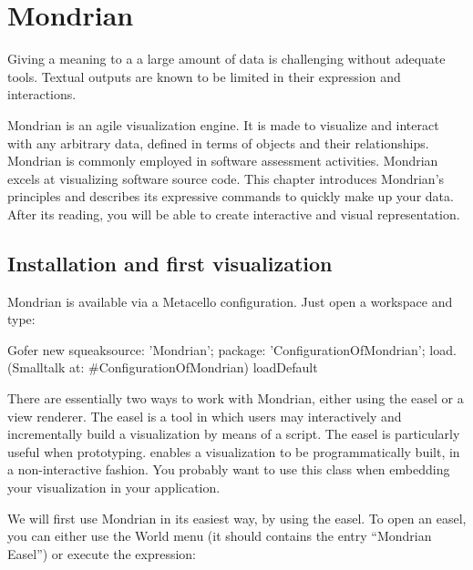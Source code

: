 \documentclass[a4paper,10pt,twoside]{book}
\begin{document}
\fi
\sloppy
\chapter{Mondrian}


Giving a meaning to a a large amount of data is challenging without adequate tools. Textual outputs are known to be limited in their expression and interactions. 

Mondrian is an agile visualization engine. It is made to visualize and interact with any arbitrary data, defined in terms of objects and their relationships. Mondrian is commonly employed in software assessment activities. Mondrian excels at visualizing software source code. This chapter introduces Mondrian's principles and describes its expressive commands to quickly make up your data. After its reading, you will be able to create interactive and visual representation.


\section{Installation and first visualization}

Mondrian is available via a Metacello configuration. Just open a workspace and type:
\begin{code}{}
Gofer new
	squeaksource: 'Mondrian'; 
	package: 'ConfigurationOfMondrian';
	load.
(Smalltalk at: #ConfigurationOfMondrian) loadDefault
\end{code}

There are essentially two ways to work with Mondrian, either using the easel or a view renderer. 
The easel is a tool in which users may interactively and incrementally build a visualization by means of a script.  The easel is particularly useful when prototyping.
 enables a visualization to be programmatically built, in a non-interactive fashion. You probably want to use this class when embedding your visualization in your application.

We will first use Mondrian in its easiest way, by using the easel. To open an easel, you can either use the World menu (it should contains the entry ``Mondrian Easel'') or execute the expression:
\end{document}
